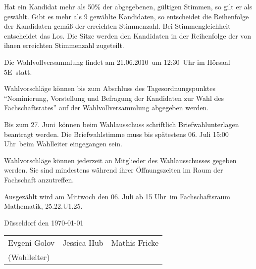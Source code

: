 \documentclass[a4paper,10pt]{scrartcl}
\def\wahlvvDatum{21.06.2010}
\def\wahlvvUhr{12:30}
\def\wahlvvSaal{5E}
\def\buero{Fachschaftsraum Mathematik, 25.22.U1.25}
\def\wahlleiter{Evgeni Golov}
\def\wahlpersonzwei{Jessica Hub}
\def\wahlpersondrei{Mathis Fricke}
\def\briefwahlAntrag{27. Juni}
\def\briefwahlEnde{06. Juli 15:00 Uhr}
\def\auszaehlung{Mittwoch den 06. Juli ab 15 Uhr}
\begin{document}
Hat ein Kandidat mehr als 50\% der abgegebenen, gültigen Stimmen, so gilt er als gewählt. Gibt es mehr als 9 gewählte Kandidaten, so entscheidet die Reihenfolge der Kandidaten gemäß der erreichten Stimmenzahl. Bei Stimmengleichheit entscheidet das Los. Die Sitze werden den Kandidaten in der Reihenfolge der von ihnen erreichten Stimmenzahl zugeteilt.

Die Wahlvollversammlung findet am \wahlvvDatum~um \wahlvvUhr~Uhr im Hörsaal \wahlvvSaal~statt.

Wahlvorschläge können bis zum Abschluss des Tagesordnungspunktes ``Nominierung, Vorstellung und Befragung der Kandidaten zur Wahl des Fachschaftsrates'' auf der Wahlvollversammlung abgegeben werden. 

Bis zum \briefwahlAntrag~können beim Wahlausschuss schriftlich Briefwahlunterlagen beantragt werden. Die Briefwahlstimme muss bis spätestens \briefwahlEnde~beim Wahlleiter eingegangen sein.

Wahlvorschläge können jederzeit an Mitglieder des Wahlausschusses gegeben werden. Sie sind mindestens während ihrer Öffnungszeiten im Raum der Fachschaft anzutreffen.

Ausgezählt wird am \auszaehlung~im \buero.

\vspace{1em}

Düsseldorf den \today

\vspace{1em}

\begin{center}
\begin{tabular}{lll}
\wahlleiter \hspace{2cm} & \wahlpersonzwei & \hspace{2cm} \wahlpersondrei \\
(Wahlleiter) & & 
\end{tabular}
\end{center}
\end{document}
